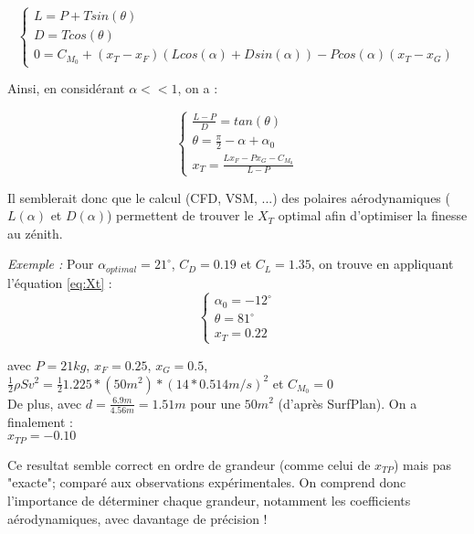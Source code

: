 \begin{equation}
    \begin{cases}
        L = P + T sin(\theta) \\
        D = T cos(\theta) \\
        0 = C_{M_0} + (x_T - x_F) (L cos(\alpha) + D sin(\alpha)) - P cos(\alpha) (x_T - x_G)
    \end{cases}
\end{equation}

Ainsi, en considérant $\alpha << 1$, on a :

\begin{equation}
    \begin{cases}
    \frac{L-P}{D} = tan(\theta) \\
    \theta = \frac{\pi}{2} - \alpha + \alpha_0 \\
    x_T = \frac{L x_F - P x_G -C_{M_0}}{L - P}
    \end{cases}
    \label{eq:Xt}
\end{equation}
    
Il semblerait donc que le calcul (CFD, VSM, ...) des polaires aérodynamiques ($L(\alpha)$ et $D(\alpha)$) permettent de trouver le $X_T$ optimal afin d'optimiser la finesse au zénith. 

\textit{Exemple : }
Pour $\alpha_{optimal} = 21^\circ$, $C_D = 0.19$ et $C_L = 1.35$, on trouve en appliquant l'équation \ref{eq:Xt} : \\

\begin{equation}
    \begin{cases}
    \alpha_0 =  -12^\circ\\
    \theta = 81^\circ\\
    x_T = 0.22
    \end{cases}
    \label{eq:Xt results}
\end{equation}

avec $P = 21 kg$, $x_F = 0.25$, $x_G = 0.5$,$\frac{1}{2} \rho S v^2 = \frac{1}{2} 1.225 * (50m^2) * (14 * 0.514 m/s)^2$  et $C_{M_0} = 0$ \\

De plus, avec  $d = \frac{6.9 m}{4.56 m} = 1.51 m$ pour une $50m^2$ (d'après SurfPlan). On a finalement :\\
$x_{TP} = -0.10 $

Ce resultat semble correct en ordre de grandeur (comme celui de $x_{TP}$) mais pas "exacte"; comparé aux observations expérimentales. On comprend donc l'importance de déterminer chaque grandeur, notamment les coefficients aérodynamiques, avec davantage de précision !


